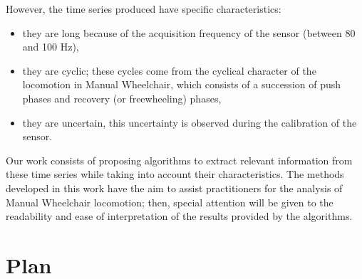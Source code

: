 However, the time series produced  have specific characteristics: 
\begin{itemize}
\item they are long because of the acquisition frequency of the sensor (between 80 and 100 Hz),
\item they are cyclic; these cycles come from the cyclical character of the locomotion in Manual Wheelchair, which consists of a succession of push phases and recovery (or freewheeling) phases,
\item they are uncertain, this uncertainty is observed during the calibration of the sensor.
\end{itemize}
  

Our work consists of proposing algorithms to extract relevant information from these time series while taking into account their characteristics. The methods developed in this work have the aim to assist practitioners for the analysis of Manual Wheelchair locomotion; then, special attention will be given to the readability and ease of interpretation of the results provided by the  algorithms.


\section*{Plan}

